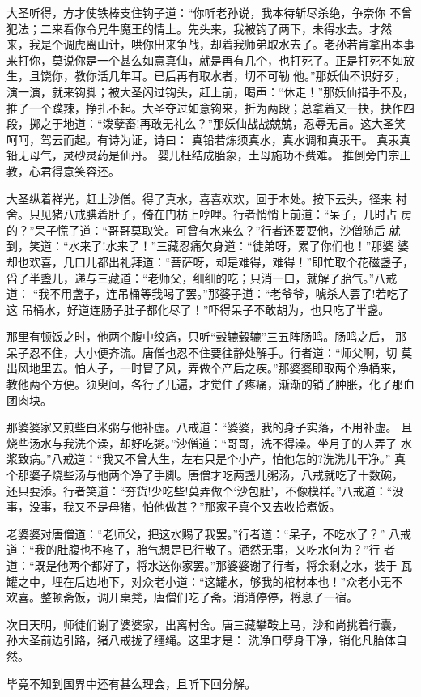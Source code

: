 大圣听得，方才使铁棒支住钩子道：“你听老孙说，我本待斩尽杀绝，争奈你
不曾犯法；二来看你令兄牛魔王的情上。先头来，我被钩了两下，未得水去。才然
来，我是个调虎离山计，哄你出来争战，却着我师弟取水去了。老孙若肯拿出本事
来打你，莫说你是一个甚么如意真仙，就是再有几个，也打死了。正是打死不如放
生，且饶你，教你活几年耳。已后再有取水者，切不可勒他。”那妖仙不识好歹，
演一演，就来钩脚；被大圣闪过钩头，赶上前，喝声：“休走！”那妖仙措手不及，
推了一个蹼辣，挣扎不起。大圣夺过如意钩来，折为两段；总拿着又一抉，抉作四
段，掷之于地道：“泼孽畜!再敢无礼么？”那妖仙战战兢兢，忍辱无言。这大圣笑
呵呵，驾云而起。有诗为证，诗曰：
真铅若炼须真水，真水调和真汞干。
真汞真铅无母气，灵砂灵药是仙丹。
婴儿枉结成胎象，土母施功不费难。
推倒旁门宗正教，心君得意笑容还。

大圣纵着祥光，赶上沙僧。得了真水，喜喜欢欢，回于本处。按下云头，径来
村舍。只见猪八戒腆着肚子，倚在门枋上哼哩。行者悄悄上前道：“呆子，几时占
房的？”呆子慌了道：“哥哥莫取笑。可曾有水来么？”行者还要耍他，沙僧随后
就到，笑道：“水来了!水来了！”三藏忍痛欠身道：“徒弟呀，累了你们也！”那婆
婆却也欢喜，几口儿都出礼拜道：“菩萨呀，却是难得，难得！”即忙取个花磁盏子，
舀了半盏儿，递与三藏道：“老师父，细细的吃；只消一口，就解了胎气。”八戒道：
“我不用盏子，连吊桶等我喝了罢。”那婆子道：“老爷爷，唬杀人罢了!若吃了这
吊桶水，好道连肠子肚子都化尽了！”吓得呆子不敢胡为，也只吃了半盏。

那里有顿饭之时，他两个腹中绞痛，只听“毂辘毂辘”三五阵肠鸣。肠鸣之后，
那呆子忍不住，大小便齐流。唐僧也忍不住要往静处解手。行者道：“师父啊，切
莫出风地里去。怕人子，一时冒了风，弄做个产后之疾。”那婆婆即取两个净桶来，
教他两个方便。须臾间，各行了几遍，才觉住了疼痛，渐渐的销了肿胀，化了那血
团肉块。

那婆婆家又煎些白米粥与他补虚。八戒道：“婆婆，我的身子实落，不用补虚。
且烧些汤水与我洗个澡，却好吃粥。”沙僧道：“哥哥，洗不得澡。坐月子的人弄了
水浆致病。”八戒道：“我又不曾大生，左右只是个小产，怕他怎的?洗洗儿干净。”
真个那婆子烧些汤与他两个净了手脚。唐僧才吃两盏儿粥汤，八戒就吃了十数碗，
还只要添。行者笑道：“夯货!少吃些!莫弄做个‘沙包肚’，不像模样。”八戒道：“没
事，没事，我又不是母猪，怕他做甚？”那家子真个又去收拾煮饭。

老婆婆对唐僧道：“老师父，把这水赐了我罢。”行者道：“呆子，不吃水了？”
八戒道：“我的肚腹也不疼了，胎气想是已行散了。洒然无事，又吃水何为？”行
者道：“既是他两个都好了，将水送你家罢。”那婆婆谢了行者，将余剩之水，装于
瓦罐之中，埋在后边地下，对众老小道：“这罐水，够我的棺材本也！”众老小无不
欢喜。整顿斋饭，调开桌凳，唐僧们吃了斋。消消停停，将息了一宿。

次日天明，师徒们谢了婆婆家，出离村舍。唐三藏攀鞍上马，沙和尚挑着行囊，
孙大圣前边引路，猪八戒拢了缰绳。这里才是：
洗净口孽身干净，销化凡胎体自然。

毕竟不知到国界中还有甚么理会，且听下回分解。